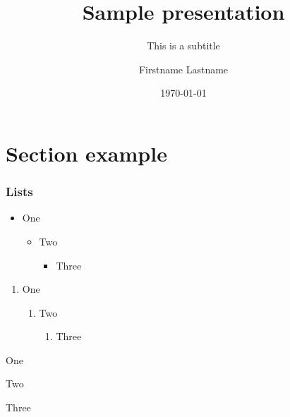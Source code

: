 \documentclass{beamer}
\title{Sample presentation}
\subtitle{This is a subtitle}
\author{Firstname Lastname}
\institute{Worcester Polytechnic Institute}
\date{\today}
\begin{document}
\maketitle

\section{Section example}

\begin{frame}
  \frametitle{Lists}
  \begin{itemize}
  \item One
    \begin{itemize}
    \item Two
      \begin{itemize}
      \item Three
      \end{itemize}
    \end{itemize}
  \end{itemize}

  \begin{enumerate}
  \item One
    \begin{enumerate}
    \item Two
      \begin{enumerate}
      \item Three
      \end{enumerate}
    \end{enumerate}
  \end{enumerate}

  \begin{description}[One]
  \item[One] One
    \begin{description}[Two]
    \item[Two] Two
      \begin{description}[Three]
      \item[Three] Three
      \end{description}
    \end{description}
  \end{description}
\end{frame}
\end{document}
